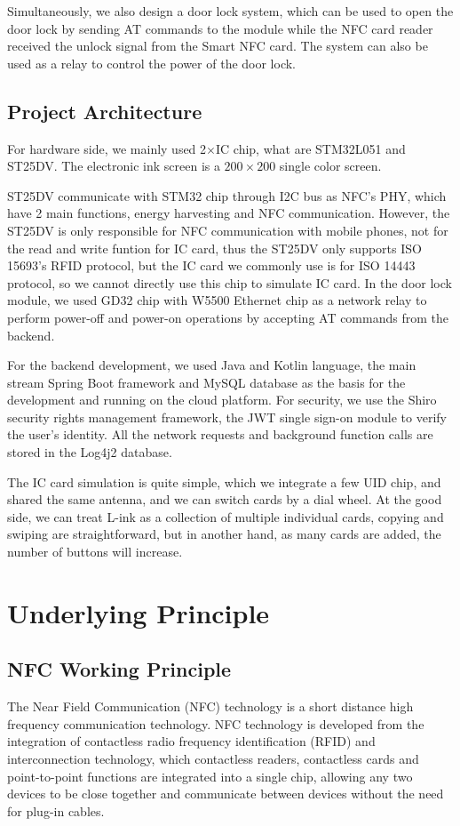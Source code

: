\documentclass[11pt, a4paper]{article}
\begin{document}
Simultaneously, we also design a door lock system, which can be used to open the door lock by sending AT commands to the module while the NFC card reader received the unlock signal from the Smart NFC card.
The system can also be used as a relay to control the power of the door lock.

\subsection{Project Architecture}
For hardware side, we mainly used 2$\times$IC chip, what are STM32L051 and ST25DV. The electronic ink screen is a $200 \times 200$ single color screen.

ST25DV communicate with STM32 chip through I2C bus as NFC's PHY, which have 2 main functions, energy harvesting and NFC communication.
However, the ST25DV is only responsible for NFC communication with mobile phones, not for the read and write funtion for IC card, thus the ST25DV only supports ISO 15693's RFID protocol, but the IC card we commonly use is for ISO 14443 protocol, so we cannot directly use this chip to simulate IC card.
In the door lock module, we used GD32 chip with W5500 Ethernet chip as a network relay to perform power-off and power-on operations by accepting AT commands from the backend.

For the backend development, we used Java and Kotlin language, the main stream Spring Boot framework and MySQL database as the basis for the development and running on the cloud platform.
For security, we use the Shiro security rights management framework, the JWT single sign-on module to verify the user's identity.
All the network requests and background function calls are stored in the Log4j2 database.

The IC card simulation is quite simple, which we integrate a few UID chip, and shared the same antenna, and we can switch cards by a dial wheel. At the good side, we can treat L-ink as a collection of multiple individual cards, copying and swiping are straightforward, but in another hand, as many cards are added, the number of buttons will increase.


\section{Underlying Principle}

\subsection{NFC Working Principle}
The Near Field Communication (NFC) technology is a short distance high frequency communication technology. NFC technology is developed from the integration of contactless radio frequency identification (RFID) and interconnection technology, which contactless readers, contactless cards and point-to-point functions are integrated into a single chip, allowing any two devices to be close together and communicate between devices without the need for plug-in cables.
\end{document}
